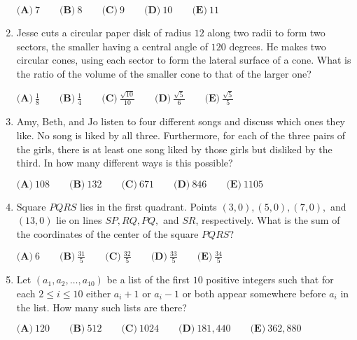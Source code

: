 \documentclass{article}
\begin{document}
\begin{enumerate}[label=\arabic*., itemsep=0.5em]
\( \textbf{(A)}\ 7\qquad\textbf{(B)}\ 8\qquad\textbf{(C)}\ 9\qquad\textbf{(D)}\ 10\qquad\textbf{(E)}\ 11 \)\par \vspace{0.5em}\item Jesse cuts a circular paper disk of radius \(12\) along two radii to form two sectors, the smaller having a central angle of \(120\) degrees. He makes two circular cones, using each sector to form the lateral surface of a cone. What is the ratio of the volume of the smaller cone to that of the larger one?

\(\textbf{(A)}\ \frac{1}{8}\qquad\textbf{(B)}\ \frac{1}{4}\qquad\textbf{(C)}\ \frac{\sqrt{10}}{10}\qquad\textbf{(D)}\ \frac{\sqrt{5}}{6}\qquad\textbf{(E)}\ \frac{\sqrt{5}}{5}\)\par \vspace{0.5em}\item Amy, Beth, and Jo listen to four different songs and discuss which ones they like. No song is liked by all three. Furthermore, for each of the three pairs of the girls, there is at least one song liked by those girls but disliked by the third. In how many different ways is this possible?

\(\textbf{(A)}\ 108\qquad\textbf{(B)}\ 132\qquad\textbf{(C)}\ 671\qquad\textbf{(D)}\ 846\qquad\textbf{(E)}\ 1105 \)\par \vspace{0.5em}\item Square \(PQRS\) lies in the first quadrant. Points \((3,0), (5,0), (7,0),\) and \((13,0)\) lie on lines \(SP, RQ, PQ,\) and \(SR\), respectively. What is the sum of the coordinates of the center of the square \(PQRS\)?

\(\textbf{(A)}\ 6\qquad\textbf{(B)}\ \frac{31}{5}\qquad\textbf{(C)}\ \frac{32}{5}\qquad\textbf{(D)}\ \frac{33}{5}\qquad\textbf{(E)}\ \frac{34}{5} \)\par \vspace{0.5em}\item Let \((a_1,a_2, \dots ,a_{10})\) be a list of the first \(10\) positive integers such that for each \(2 \le i \le 10\) either \(a_i+1\) or \(a_i-1\) or both appear somewhere before \(a_i\) in the list. How many such lists are there?

\(\textbf{(A)}\ 120\qquad\textbf{(B)}\ 512\qquad\textbf{(C)}\ 1024\qquad\textbf{(D)}\ 181,440\qquad\textbf{(E)}\ 362,880\)



\end{enumerate}
\end{document}

